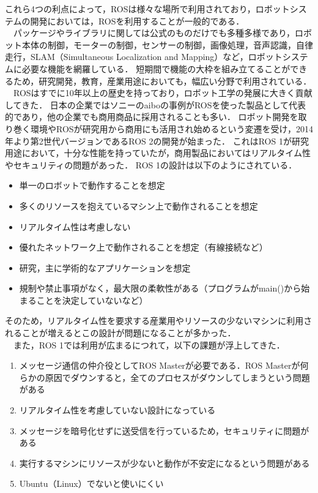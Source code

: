 これら4つの利点によって，ROSは様々な場所で利用されており，ロボットシステムの開発においては，ROSを利用することが一般的である．
\\　パッケージやライブラリに関しては公式のものだけでも多種多様であり，ロボット本体の制御，モーターの制御，センサーの制御，画像処理，音声認識，自律走行，SLAM（Simultaneous Localization and Mapping）など，ロボットシステムに必要な機能を網羅している．
短期間で機能の大枠を組み立てることができるため，研究開発，教育，産業用途においても，幅広い分野で利用されている．\\
　ROSはすでに10年以上の歴史を持っており，ロボット工学の発展に大きく貢献してきた．
日本の企業ではソニーのaiboの事例がROSを使った製品として代表的であり，他の企業でも商用商品に採用されることも多い．
ロボット開発を取り巻く環境やROSが研究用から商用にも活用され始めるという変遷を受け，2014年より第2世代バージョンであるROS 2の開発が始まった．
これはROS 1が研究用途において，十分な性能を持っていたが，商用製品においてはリアルタイム性やセキュリティの問題があった．
ROS 1の設計は以下のようにされている．
    \begin{itemize}
        \item 単一のロボットで動作することを想定
        \item 多くのリソースを抱えているマシン上で動作されることを想定
        \item リアルタイム性は考慮しない
        \item 優れたネットワーク上で動作されることを想定（有線接続など）
        \item 研究，主に学術的なアプリケーションを想定
        \item 規制や禁止事項がなく，最大限の柔軟性がある（プログラムがmain()から始まることを決定していないなど）
    \end{itemize}
そのため，リアルタイム性を要求する産業用やリソースの少ないマシンに利用されることが増えるとこの設計が問題になることが多かった．
\\　また，ROS 1では利用が広まるにつれて，以下の課題が浮上してきた．
   \begin{enumerate}
       \item メッセージ通信の仲介役としてROS Masterが必要である．ROS Masterが何らかの原因でダウンすると，全てのプロセスがダウンしてしまうという問題がある
       \item リアルタイム性を考慮していない設計になっている
       \item メッセージを暗号化せずに送受信を行っているため，セキュリティに問題がある
       \item 実行するマシンにリソースが少ないと動作が不安定になるという問題がある
       \item Ubuntu（Linux）でないと使いにくい
   \end{enumerate}
